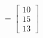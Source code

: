 \documentclass[preview]{standalone}
\begin{document}
\begin{align*}
=\begin{bmatrix} 10 \\ 15 \\ 13 \end{bmatrix}
\end{align*}
\end{document}
